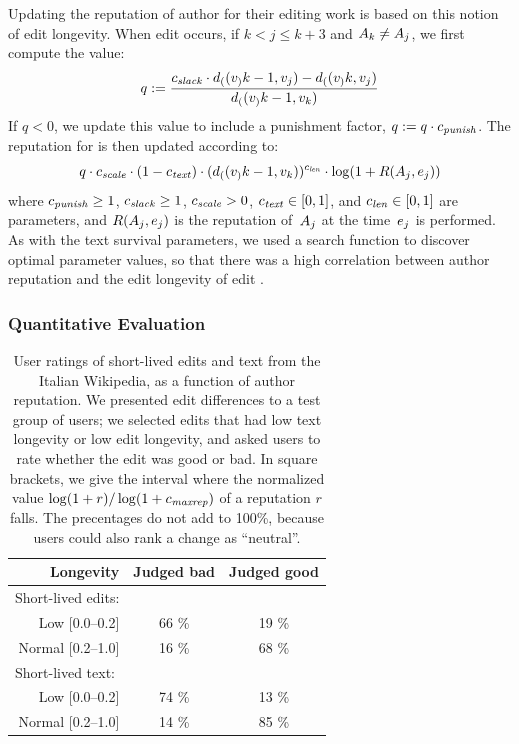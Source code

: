   Updating the reputation of author  for their editing
  work is based on this notion of edit longevity.
  When edit  occurs, if
  $k < j \le k+3$ and $A_{k} \ne A_{j}$,
  we first compute the value:
  \begin{equation*}
  	q := \frac{ {c_{{\text{\textit{slack}}}}} \cdot d_{(}(v_{)}{k-1},v_{j})
		- d_{(}(v_{)}{k},v_{j}) }
		{ d_{(}(v_{)}{k-1},v_{k}) }
  \end{equation*}
  If $q < 0$, we update this value to include a punishment factor,
  $q := q \cdot {c_{{\text{\textit{punish}}}}}$.
  The reputation for  is then updated according to:
  \begin{equation*}
  	q \cdot {c_{{\text{\textit{scale}}}}} \cdot (1 - {c_{{\text{\textit{text}}}}}) \cdot
	        (d_{(}(v_{)}{k-1},v_{k}))^{c_{{\text{\textit{len}}}}}
		\cdot \log(1 + R(A_{j},e_{j}))
  \end{equation*}
  where ${c_{{\text{\textit{punish}}}}} \geq 1$, ${c_{{\text{\textit{slack}}}}} \geq 1$, ${c_{{\text{\textit{scale}}}}} > 0$,
  ${c_{{\text{\textit{text}}}}} \in [0,1]$, and ${c_{{\text{\textit{len}}}}} \in [0,1]$ are parameters,
  and $R(A_{j},e_{j})$ is the reputation
  of~$A_{j}$ at the time~$e_{j}$ is performed.
  As with the text survival parameters, we used a search function
  to discover optimal parameter values, so that there was a high
  correlation between author reputation and the edit longevity
  of edit .


\subsubsection*{Quantitative Evaluation}

\begin{table}
\begin{center}
\begin{tabular}{|r|c|c|} \hline
Longevity & Judged bad & Judged good \\ \hline
\multicolumn{1}{|l|}{Short-lived edits: \qquad \quad} & & \\[1ex]
   Low [0.0--0.2]   &    66  \% &    19 \% \\
Normal [0.2--1.0]   &    16  \% &    68 \% \\ \hline
\multicolumn{1}{|l|}{Short-lived text: \qquad \quad} & & \\[1ex]
   Low [0.0--0.2]   &    74  \% &    13 \% \\
Normal [0.2--1.0]   &    14  \% &    85 \% \\ \hline
\end{tabular}
\end{center}
\caption{User ratings of short-lived edits and text from the
  Italian Wikipedia, as a function of author reputation.
  We presented edit differences to a test group of users;
  we selected edits that had
  low text longevity or low edit longevity,
  and asked users to rate whether the edit was good or bad.
  In square brackets, we give the
  interval where the normalized value $\log(1+r) / \log (1 +
  {c_{{\text{\textit{maxrep}}}}})$ of a reputation $r$ falls.  The precentages do not
  add to 100\%, because users could also rank a change as ``neutral''.}
\label{tbl:human}
\end{table}


